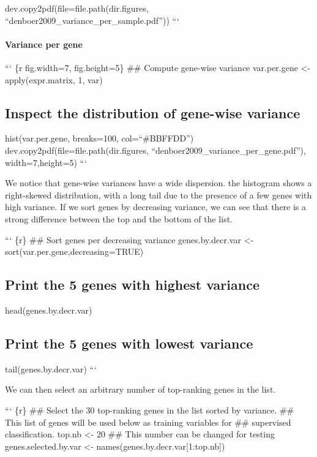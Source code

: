 dev.copy2pdf(file=file.path(dir.figures,
``denboer2009\_variance\_per\_sample.pdf'')) ```

\paragraph{Variance per gene}\label{variance-per-gene}

``` \{r fig.width=7, fig.height=5\} \#\# Compute gene-wise variance
var.per.gene \textless{}- apply(expr.matrix, 1, var)

\subsection{Inspect the distribution of gene-wise
variance}\label{inspect-the-distribution-of-gene-wise-variance}

hist(var.per.gene, breaks=100, col=``\#BBFFDD'')
dev.copy2pdf(file=file.path(dir.figures,
``denboer2009\_variance\_per\_gene.pdf''), width=7,height=5) ```

We notice that gene-wise variances have a wide dispersion. the histogram
shows a right-skewed distribution, with a long tail due to the presence
of a few genes with high variance. If we sort genes by decreasing
variance, we can see that there is a strong difference between the top
and the bottom of the list.

``` \{r\} \#\# Sort genes per decreasing variance genes.by.decr.var
\textless{}- sort(var.per.gene,decreasing=TRUE)

\subsection{Print the 5 genes with highest
variance}\label{print-the-5-genes-with-highest-variance}

head(genes.by.decr.var)

\subsection{Print the 5 genes with lowest
variance}\label{print-the-5-genes-with-lowest-variance}

tail(genes.by.decr.var) ```

We can then select an arbitrary number of top-ranking genes in the list.

``` \{r\} \#\# Select the 30 top-ranking genes in the list sorted by
variance. \#\# This list of genes will be used below as training
variables for \#\# supervised classification. top.nb \textless{}- 20
\#\# This number can be changed for testing genes.selected.by.var
\textless{}- names(genes.by.decr.var{[}1:top.nb{]})

